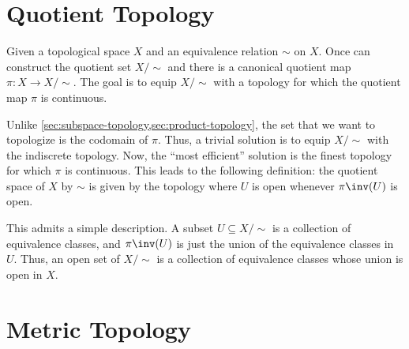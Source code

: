 \documentclass{amsart}
\begin{document}
\section{Quotient Topology}
\label{sec:quotient-topology}

Given a topological space $X$ and an equivalence relation $\sim$ on $X$.
Once can construct the quotient set $X/\sim$ and there is a canonical quotient map $\pi : X \to X/\sim$.
The goal is to equip $X/\sim$ with a topology for which the quotient map $\pi$ is continuous.

Unlike \cref{sec:subspace-topology,sec:product-topology}, the set that we want to topologize is the codomain of $\pi$.
Thus, a trivial solution is to equip $X/\sim$ with the indiscrete topology.
Now, the ``most efficient'' solution is the finest topology for which $\pi$ is continuous.
This leads to the following definition: the quotient space of $X$ by $\sim$ is given by the topology where $U$ is open whenever $\pi\inv(U)$ is open.

This admits a simple description.
A subset $U \subseteq X/\sim$ is a collection of equivalence classes, and $\pi\inv(U)$ is just the union of the equivalence classes in $U$.
Thus, an open set of $X/\sim$ is a collection of equivalence classes whose union is open in $X$.

\section{Metric Topology}
\label{sec:metric-topology}
\end{document}
